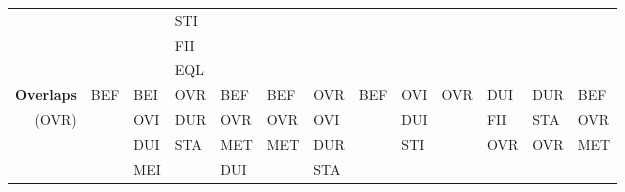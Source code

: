 \documentclass[11pt]{report}
\newenvironment{vvarmargin}[2]
{
  \begin{list}{}
  {
    \setlength{\topsep}{0pt}
    \setlength{\leftmargin}{0pt}
    \setlength{\rightmargin}{0pt}
    \setlength{\listparindent}{\parindent}
    \setlength{\itemindent}{\parindent}
    \setlength{\parsep}{0pt plus 1pt}
    \addtolength{\leftmargin}{#1}\addtolength{\rightmargin}{#2}
  }
  \item
}
{
  \end{list}
}
\begin{document}
\begin{table}[p]
\begin{vvarmargin}{-4cm}{-4cm}
\begin{center}
\begin{tabular}[t]{|r|l|l|l|l|l|l|l|l|l|l|l|l|}
                                        &                         &                         & STI                     &                         &                         &                         &                         &                         &                         &                         &                         &                         \\
                                        &                         &                         & FII                     &                         &                         &                         &                         &                         &                         &                         &                         &                         \\
                                        &                         &                         & EQL                     &                         &                         &                         &                         &                         &                         &                         &                         &                         \\
                \hline
                \textbf{Overlaps}       & BEF                     & BEI                     & OVR                     & BEF                     & BEF                     & OVR                     & BEF                     & OVI                     & OVR                     & DUI                     & DUR                     & BEF                     \\
                (OVR)                   &                         & OVI                     & DUR                     & OVR                     & OVR                     & OVI                     &                         & DUI                     &                         & FII                     & STA                     & OVR                     \\
                                        &                         & DUI                     & STA                     & MET                     & MET                     & DUR                     &                         & STI                     &                         & OVR                     & OVR                     & MET                     \\
                                        &                         & MEI                     &                         & DUI                     &                         & STA                     &                         &                         &                         &                         &                         &                         \\

\end{tabular}
\end{center}
\end{vvarmargin}
\end{table}
\end{document}
